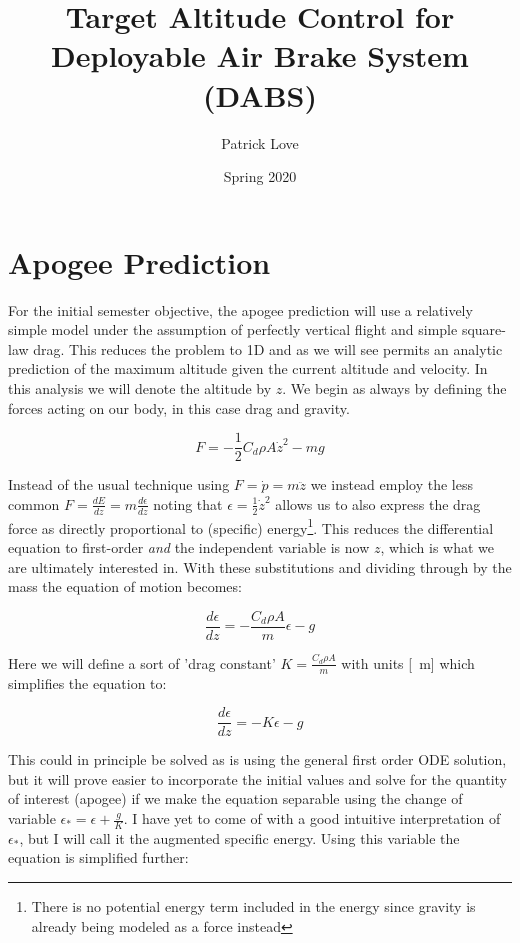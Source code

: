 \documentclass{article}
\title{Target Altitude Control for Deployable Air Brake System (DABS)}
\date{Spring 2020}
\author{Patrick Love}
\begin{document}
	
	\maketitle
	
	\section{Apogee Prediction}
	
	For the initial semester objective, the apogee prediction will use a relatively simple model under the assumption of perfectly vertical flight and simple square-law drag.  This reduces the problem to 1D and as we will see permits an analytic prediction of the maximum altitude given the current altitude and velocity.  In this analysis we will denote the altitude by $z$.  We begin as always by defining the forces acting on our body, in this case drag and gravity.
	
	\begin{equation}
		F = -\frac{1}{2}C_d\rho A\dot{z}^2-mg
	\end{equation}
	
	Instead of the usual technique using $F=\dot{p}=m\ddot{z}$ we instead employ the less common $F=\frac{dE}{dz}=m\frac{d\epsilon}{dz}$ noting that $\epsilon=\frac{1}{2}\dot{z}^2$ allows us to also express the drag force as directly proportional to (specific) energy\footnote{There is no potential energy term included in the energy since gravity is already being modeled as a force instead}.  This reduces the differential equation to first-order \textit{and} the independent variable is now $z$, which is what we are ultimately interested in.  With these substitutions and dividing through by the mass the equation of motion becomes:
	
	\begin{equation}
		\frac{d\epsilon}{dz} = -\frac{C_d\rho A}{m}\epsilon-g 
	\end{equation}
	
	Here we will define a sort of 'drag constant' $K = \frac{C_d\rho A}{m} $ with units [\si{\per\meter}] which simplifies the equation to:
	
	\begin{equation}
	\label{eqn:vertde}
	\frac{d\epsilon}{dz} = -K\epsilon-g 
	\end{equation}
	
	This could in principle be solved as is using the general first order ODE solution, but it will prove easier to incorporate the initial values and solve for the quantity of interest (apogee) if we make the equation separable using the change of variable $\epsilon_* = \epsilon+\frac{g}{K}$.  I have yet to come of with a good intuitive interpretation of $\epsilon_*$, but I will call it the augmented specific energy.  Using this variable the equation is simplified further:
	
\end{document}

